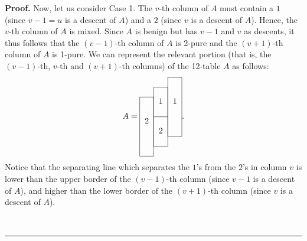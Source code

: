 \documentclass[numbers=enddot,12pt,final,onecolumn,notitlepage]{scrartcl}%
\theoremstyle{definition}
\newenvironment{proof}[1][Proof]{\noindent\textbf{#1.} }{\ \rule{0.5em}{0.5em}}
\begin{document}
\begin{proof}
Now, let us consider Case 1.
The $v$-th column of $A$ must contain a $1$ (since $v-1 = u$ is a descent of $A$)
and a $2$ (since $v$ is a descent of $A$). Hence, the $v$-th column of $A$ is
mixed. Since $A$ is benign but has $v-1$ and $v$ as descents, it thus follows
that the $\left(  v-1\right)  $-th column of $A$ is
2-pure and the
$\left(  v+1\right)  $-th column of $A$ is 1-pure. We can represent the
relevant portion (that is, the $\left(v-1\right)$-th, $v$-th and
$\left(v+1\right)$-th columns) of the 12-table $A$ as follows:
\begin{equation}
A=%
\begin{tabular}{ccc}
\cline{3-3} & & \multicolumn{1}{|c|}{} \\
\cline{2-2} & \multicolumn{1}{|c|}{} & \multicolumn{1}{|c|}{} \\
\cline{1-1} \multicolumn{1}{|c|}{} & \multicolumn{1}{|c|}{1} & \multicolumn
{1}{|c|}{1} \\
\multicolumn{1}{|c|}{} & \multicolumn{1}{|c|}{} & \multicolumn{1}{|c|}{} \\
\cline{2-2} \multicolumn{1}{|c|}{2} & \multicolumn{1}{|c|}{} & \multicolumn
{1}{|c|}{} \\
\multicolumn{1}{|c|}{} & \multicolumn{1}{|c|}{2} & \multicolumn{1}{|c|}{} \\
\cline{3-3} \multicolumn{1}{|c|}{} & \multicolumn{1}{|c|}{} \\
\cline{2-2} \multicolumn{1}{|c|}{} \\
\cline{1-1}
\end{tabular}%
. \label{pf.prop.descent-resolution.hyps.short.A}%
\end{equation}
Notice that the separating line which separates the $1$'s from the
$2$'s in column $v$ is lower than the upper border of the
$\left(v-1\right)$-th column (since $v-1$ is a descent of $A$), and
higher than the lower border of the $\left(v+1\right)$-th column
(since $v$ is a descent of $A$).


\end{proof}
\end{document}
